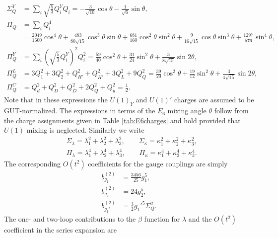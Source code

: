 \documentclass[preprint,amsmath,amssymb,aps,superscriptaddress,prd,
showpacs,floatfix,nofootinbib]{revtex4-1}
\begin{document}
\begin{align*}
\Sigma_{Q}^Y &= \sum_i \sqrt{\frac{5}{3}} Q_i^Y Q_i =
-\frac{3}{\sqrt{10}} \cos\theta - \frac{1}{\sqrt{6}} \sin\theta , \\
\Pi_{Q} &= \sum_i Q_i^4 \\
&= \frac{2049}{1600} \cos^4\theta +
\frac{483}{80\sqrt{15}} \cos^3\theta \sin\theta +
\frac{681}{160} \cos^2\theta \sin^2\theta +
\frac{9}{16\sqrt{15}} \cos\theta \sin^3\theta +
\frac{1297}{576}\sin^4\theta , \\
\Pi_{Q}^Y &= \sum_i \left ( \sqrt{\frac{5}{3}} Q_i^Y \right )^2 Q_i^2 =
\frac{59}{40} \cos^2\theta + \frac{31}{24} \sin^2\theta +
\frac{3}{8\sqrt{15}} \sin 2\theta , \\
\Pi_{Q}^L &= 3 Q_1^2 + 3Q_2^2 + Q_{H'}^2 + Q_{\overline{H'}}^2 + 3 Q_L^2 +
9 Q_Q^2 = \frac{39}{20} \cos^2\theta + \frac{19}{12} \sin^2\theta +
\frac{3}{4\sqrt{15}} \sin 2\theta , \\
\Pi_{Q}^C &= Q_d^2 + Q_D^2 + Q_{\overline{D}}^2 + 2 Q_Q^2 + Q_u^2 =
\frac{1}{2} .
\end{align*}
Note that in these expressions the $U(1)_Y$ and $U(1)'$ charges are assumed to
be GUT-normalized.  The expressions in terms of the $E_6$ mixing angle
$\theta$ follow from the charge assignments given in Table \ref{tab:E6charges}
and hold provided that $U(1)$ mixing is neglected.  Similarly we write
\begin{align*}
&\Sigma_\lambda = \lambda_1^2 + \lambda_2^2 + \lambda_3^2 ,
\qquad \Sigma_\kappa = \kappa_1^2 + \kappa_2^2 + \kappa_3^2 , \\
&\Pi_\lambda = \lambda_1^4 + \lambda_2^4 + \lambda_3^4 ,
\qquad \Pi_\kappa = \kappa_1^4 + \kappa_2^4 + \kappa_3^4 .
\end{align*}
The corresponding $O(t^2)$ coefficients for the gauge couplings are simply
\begin{subequations} \label{eq:USSMGaugeOt2Coeffs}
\begin{align}
b_{g_1}^{(2)} &= \frac{3456}{25} g_1^5 , \label{eq:USSMg1Ot2Coeff} \\
b_{g_2}^{(2)} &= 24 g_2^5 , \label{eq:USSMg2Ot2Coeff} \\
b_{g_1'}^{(2)} &= \frac{3}{2} g_1'^5 \Sigma_{Q}^2 . \label{eq:USSMg1pOt2Coeff}
\end{align}
\end{subequations}
The one- and two-loop contributions to the $\beta$ function for $\lambda$
and the $O(t^2)$ coefficient in the series expansion are
\end{document}

